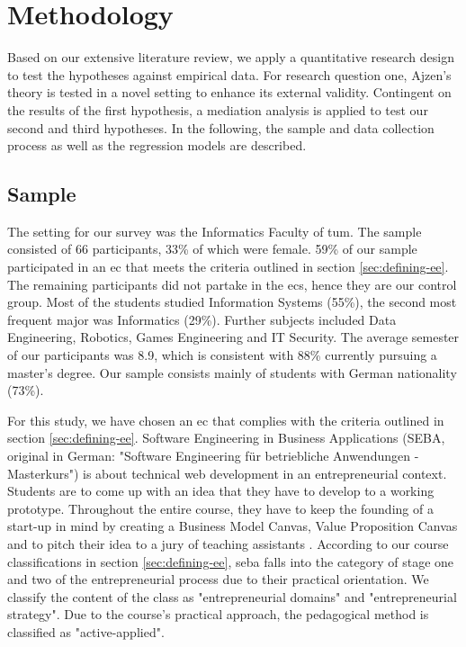\chapter{Methodology}\label{chapter:methodology}

Based on our extensive literature review, we apply a quantitative research design to test the hypotheses against empirical data. For research question one, Ajzen's theory is tested in a novel setting to enhance its external validity. Contingent on the results of the first hypothesis, a mediation analysis is applied to test our second and third hypotheses. In the following, the sample and data collection process as well as the regression models are described.

\section{Sample}
The setting for our survey was the Informatics Faculty of \ac{tum}. The sample consisted of 66 participants, 33\% of which were female. 59\% of our sample participated in an \ac{ec} that meets the criteria outlined in section \ref{sec:defining-ee}. The remaining participants did not partake in the \acp{ec}, hence they are our control group. Most of the students studied Information Systems (55\%), the second most frequent major was Informatics (29\%). Further subjects included Data Engineering, Robotics, Games Engineering and IT Security. The average semester of our participants was 8.9, which is consistent with 88\% currently pursuing a master's degree. Our sample consists mainly of students with German nationality (73\%).

For this study, we have chosen an \ac{ec} that complies with the criteria outlined in section \ref{sec:defining-ee}. Software Engineering in Business Applications (SEBA, original in German: "Software Engineering f\"ur betriebliche Anwendungen - Masterkurs") is about technical web development in an entrepreneurial context. Students are to come up with an idea that they have to develop to a working prototype. Throughout the entire course, they have to keep the founding of a start-up in mind by creating a Business Model Canvas, Value Proposition Canvas and to pitch their idea to a jury of teaching assistants \cite{Matthes2017seba}. According to our course classifications in section \ref{sec:defining-ee}, \ac{seba} falls into the category of stage one and two of the entrepreneurial process due to their practical orientation. We classify the content of the class as "entrepreneurial domains" and "entrepreneurial strategy". Due to the course's practical approach, the pedagogical method is classified as "active-applied".

